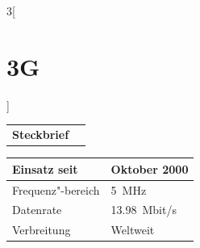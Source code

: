 \begin{multicols}{3}[\section{3G}]

\newrefsegment

\begin{boxedminipage}{\linewidth}
\begin{tabular}{p{}p{2.7 cm}}
\textbf{Steckbrief}& \\
\end{tabular}
\begin{tabular}{p{}|p{2.7 cm}}
      Einsatz seit & Oktober 2000\\
      \hline
      Frequenz"-bereich  & \SI{5}{\mega\hertz}\\
      \hline
      Datenrate & \SI{13,98}{Mbit/s}\\
      \hline
      Verbreitung & Weltweit\\
      
\end{tabular}
\end{boxedminipage}
\par

\end{multicols}
